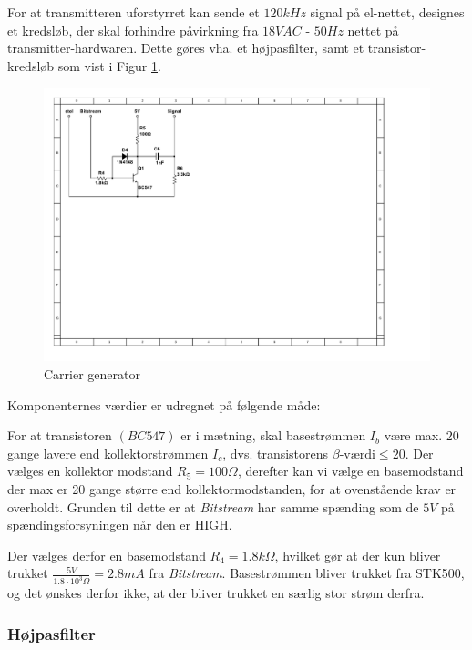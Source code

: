 For at transmitteren uforstyrret kan sende et $120kHz$ signal på el-nettet, designes et kredsløb, der skal forhindre påvirkning fra $18VAC$ - $ 50Hz$ nettet på transmitter-hardwaren. Dette gøres vha. et  højpasfilter, samt et transistor-kredsløb som vist i Figur \ref{fig:CarrierGenDesign}.

\begin{figure}[h]
	\centering
	\includegraphics[scale=0.8, trim=45 355 525 45, clip=true]{../HardwareDesign/Diagrammer/CarrierGenerator.pdf}
	\caption{Carrier generator}
	\label{fig:CarrierGenDesign}
\end{figure}

Komponenternes værdier er udregnet på følgende måde:

For at transistoren $(BC547)$\cite{lib:BC547} er i mætning, skal basestrømmen $I_{b}$ være max. $20$ gange lavere end kollektorstrømmen $I_{c}$, dvs. transistorens $\beta\text{-værdi} \leq 20$. Der vælges en kollektor modstand $R_{5}=100\Omega$, derefter kan vi vælge en basemodstand der max er 20 gange større end kollektormodstanden, for at ovenstående krav er overholdt. Grunden til dette er at \textit{Bitstream} har samme spænding som de $5V$ på spændingsforsyningen når den er HIGH.

Der vælges derfor en basemodstand $R_{4}=1.8k\Omega$, hvilket gør at der kun bliver trukket $\tfrac{5V}{1.8 \cdot 10^{3}\Omega}=2.8mA$ fra \textit{Bitstream}. Basestrømmen bliver trukket fra STK500, og det ønskes derfor ikke, at der bliver trukket en særlig stor strøm derfra.

\subsubsection{Højpasfilter}

